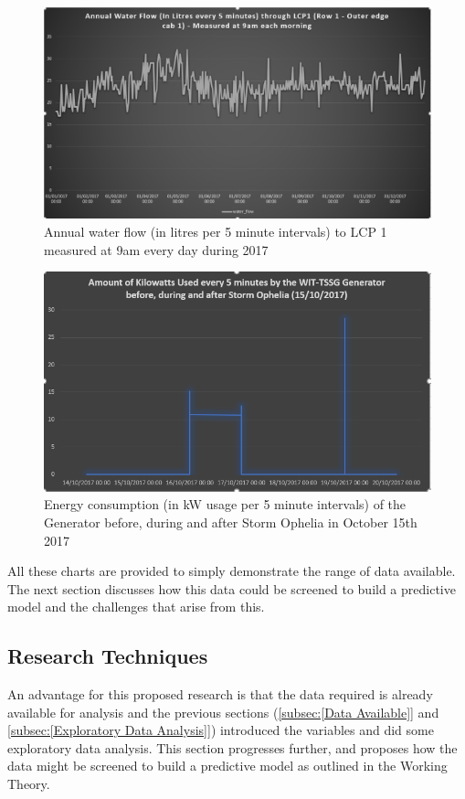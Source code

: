 \documentclass[12pt]{scrartcl}
\begin{document}
\begin{figure}[h]
  \caption{Annual water flow (in litres per 5 minute intervals) to LCP 1 measured at 9am every day during 2017}
  \label{fig:annualwaterfigure}
  \centering
    \includegraphics[scale=0.45]{Annual_Water_Flow.png}
\end{figure} 

\begin{figure}[h]
  \caption{Energy consumption (in kW usage per 5 minute intervals) of the Generator before, during and after Storm Ophelia in October 15th 2017}
  \label{fig:opheliafigure}
  \centering
    \includegraphics[scale=0.50]{Ophelia_generator.png}
\end{figure} 

All these charts are provided to simply demonstrate the range of data available. The next section discusses how this data could be screened to build a predictive model and the challenges that arise from this.  

\subsection{Research Techniques}
\label{subsec:[Research Techniques]}
An advantage for this proposed research is that the data required is already available for analysis and the previous sections (\ref{subsec:[Data Available]} and \ref{subsec:[Exploratory Data Analysis]}) introduced the variables and did some exploratory data analysis. This section progresses further, and proposes how the data might be screened to build a predictive model as outlined in the Working Theory. 
\end{document}

